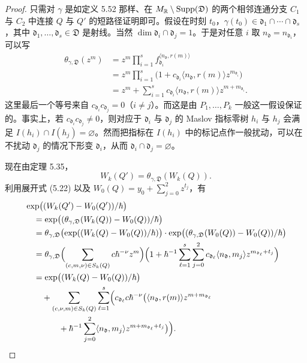 \begin{proof}
只需对 $\gamma$ 是如定义 5.52 那样、在 $M_{\mathbb{R}}\setminus\operatorname{Supp}(\mathfrak D)$ 的两个相邻连通分支 $C_1$ 与 $C_2$ 中连接 $Q$ 与 $Q'$ 的短路径证明即可。假设在时刻 $t_0$，$\gamma(t_0)\in\mathfrak d_1\cap\cdots\cap\mathfrak d_s$，其中 $\mathfrak d_1,\ldots,\mathfrak d_s\in\mathfrak D$ 是射线。当然 $\dim\mathfrak d_i\cap\mathfrak d_j=1$。于是对任意 $i$ 取 $n_{\mathfrak d}=n_{\mathfrak d_i}$，可以写
\[
  \begin{aligned}
    \theta_{\gamma,\mathfrak D}(z^m)
    &=z^m\prod_{i=1}^{s}f_{\mathfrak d_i}^{\langle n_{\mathfrak d},r(m)\rangle}\\
    &=z^m\prod_{i=1}^{s}\bigl(1+c_{\mathfrak d_i}\langle n_{\mathfrak d},r(m)\rangle z^{m_{\mathfrak d_i}}\bigr)\\
    &=z^m+\sum_{i=1}^{s}c_{\mathfrak d_i}\langle n_{\mathfrak d},r(m)\rangle z^{m+m_{\mathfrak d_i}}.
  \end{aligned}
\]
这里最后一个等号来自 $c_{\mathfrak d_i}c_{\mathfrak d_j}=0$（$i\ne j$）。而这是由 $P_1,\ldots,P_k$ 一般这一假设保证的。事实上，若 $c_{\mathfrak d_i}c_{\mathfrak d_j}\ne0$，则对应于 $\mathfrak d_i$ 与 $\mathfrak d_j$ 的 Maslov 指标零树 $h_i$ 与 $h_j$ 会满足 $I(h_i)\cap I(h_j)=\varnothing$。然而把指标在 $I(h_i)$ 中的标记点作一般扰动，可以在不扰动 $\mathfrak d_j$ 的情况下形变 $\mathfrak d_i$，从而 $\mathfrak d_i\cap\mathfrak d_j=\varnothing$。


现在由定理 5.35，
\[
  W_k(Q')=\theta_{\gamma,\mathfrak D}(W_k(Q)).
\]
利用展开式 (5.22) 以及 $W_0(Q)=y_0+\sum_{j=0}^{2}z^{t_j}$，有
\[
  \begin{aligned}
    &\exp\bigl((W_k(Q')-W_0(Q'))/\hbar\bigr)\\
    &\quad=\exp\bigl((\theta_{\gamma,\mathfrak D}(W_k(Q))-W_0(Q))/\hbar\bigr)\\
    &\quad=\theta_{\gamma,\mathfrak D}\bigl(\exp((W_k(Q)-W_0(Q))/\hbar)\bigr)
      \cdot\exp\bigl((\theta_{\gamma,\mathfrak D}(W_0(Q))-W_0(Q))/\hbar\bigr)\\
    &\quad=\theta_{\gamma,\mathfrak D}\Bigl(\sum_{(c,m,\nu)\in S_k(Q)}c\hbar^{-\nu}z^m\Bigr)
      \Bigl(1+\hbar^{-1}\sum_{\ell=1}^{s}\sum_{j=0}^{2}c_{\mathfrak d_\ell}\langle n_{\mathfrak d},m_j\rangle z^{m_{\mathfrak d_\ell}+t_j}\Bigr)\\
    &\quad=\exp\bigl((W_k(Q)-W_0(Q))/\hbar\bigr)\\
    &\qquad+\sum_{(c,\nu,m)\in S_k(Q)}\sum_{\ell=1}^{s}\Bigl(c_{\mathfrak d_\ell}c\hbar^{-\nu}\bigl(\langle n_{\mathfrak d},r(m)\rangle z^{m+m_{\mathfrak d_\ell}}\\
    &\qquad\qquad+\hbar^{-1}\sum_{j=0}^{2}\langle n_{\mathfrak d},m_j\rangle z^{m+m_{\mathfrak d_\ell}+t_j}\bigr)\Bigr).
  \end{aligned}
\]


\end{proof}
